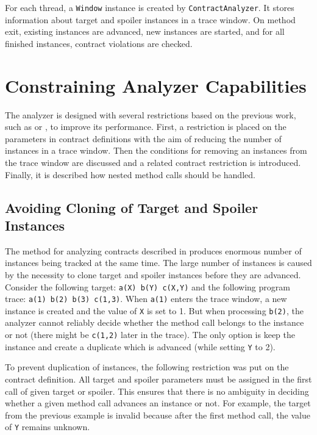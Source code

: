 For each thread, a \texttt{Window} instance is created by
\texttt{ContractAnalyzer}. It stores information about target and spoiler
instances in a trace window. On method exit, existing instances are advanced,
new instances are started, and for all finished instances, contract violations
are checked.

\section{Constraining Analyzer Capabilities}
\label{constraining}

The analyzer is designed with several restrictions based on the previous work,
such as \cite{janousek} or \cite{FITPUB10817}, to improve its performance.
First, a restriction is placed on the parameters in contract definitions with
the aim of reducing the number of instances in a trace window. Then the
conditions for removing an instances from the trace window are discussed and a
related contract restriction is introduced.  Finally, it is described how nested
method calls should be handled.

\subsection{Avoiding Cloning of Target and Spoiler Instances}

The method for analyzing contracts described in \cite{janousek} produces
enormous number of instances being tracked at the same time. The large number of
instances is caused by the necessity to clone target and spoiler instances
before they are advanced. Consider the following target: \texttt{a(X) b(Y)
c(X,Y)} and the following program trace: \texttt{a(1) b(2) b(3) c(1,3)}.  When
\texttt{a(1)} enters the trace window, a new instance is created and the value
of \texttt{X} is set to 1. But when processing \texttt{b(2)}, the analyzer
cannot reliably decide whether the method call belongs to the instance or not
(there might be \texttt{c(1,2)} later in the trace). The only option is keep the
instance and create a duplicate which is advanced (while setting \texttt{Y} to
2).

To prevent duplication of instances, the following restriction was put on the
contract definition. All target and spoiler parameters must be assigned in the
first call of given target or spoiler. This ensures that there is no ambiguity
in deciding whether a given method call advances an instance or not. For
example, the target from the previous example is invalid because after the first
method call, the value of \texttt{Y} remains unknown.

